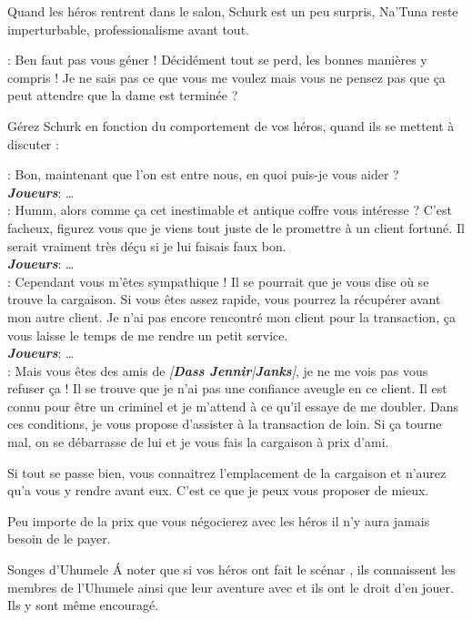 Quand les héros rentrent dans le salon, Schurk est un peu surpris, Na’Tuna reste imperturbable, professionalisme avant tout.

\begin{quotebox}
    : Ben faut pas vous géner ! Décidément tout se perd, les bonnes manières y compris ! Je ne sais pas ce que vous me voulez mais vous ne pensez pas que ça peut attendre que la dame est terminée ?
\end{quotebox}

Gérez Schurk en fonction du comportement de vos héros, quand ils se mettent à discuter :

\begin{quotebox}
    : Bon, maintenant que l’on est entre nous, en quoi puis-je vous aider ?\\
    \textit{\textbf{Joueurs}}: \ldots\\
    : Humm, alors comme ça cet inestimable et antique coffre vous intéresse ? C’est facheux, figurez vous que je viens tout juste de le promettre à un client fortuné. Il serait vraiment très déçu si je lui faisais faux bon.\\
    \textit{\textbf{Joueurs}}: \ldots\\
    : Cependant vous m’êtes sympathique ! Il se pourrait que je vous dise où se trouve la cargaison. Si vous êtes assez rapide, vous pourrez la récupérer avant mon autre client. Je n’ai pas encore rencontré mon client pour la transaction, ça vous laisse le temps de me rendre un petit service.\\
    \textit{\textbf{Joueurs}}: \ldots \\
    : Mais vous êtes des amis de \textit{[\textbf{Dass Jennir}|\textbf{Janks}]}, je ne me vois pas vous refuser ça ! Il se trouve que je n’ai pas une confiance aveugle en ce client. Il est connu pour être un criminel et je m’attend à ce qu’il essaye de me doubler. Dans ces conditions, je vous propose d’assister à la transaction de loin. Si ça tourne mal, on se débarrasse de lui et je vous fais la cargaison à prix d’ami.

    Si tout se passe bien, vous connaitrez l’emplacement de la cargaison et n’aurez qu’a vous y rendre avant eux. C’est ce que je peux vous proposer de mieux.
\end{quotebox}

Peu importe de la prix que vous négocierez avec les héros il n’y aura jamais besoin de le payer.
\begin{paperbox}{Songes d’Uhumele}
    \'A noter que si vos héros ont fait le scénar , ils connaissent les membres de l’Uhumele ainsi que leur aventure avec  et ils ont le droit d’en jouer. Ils y sont même encouragé.
\end{paperbox}
